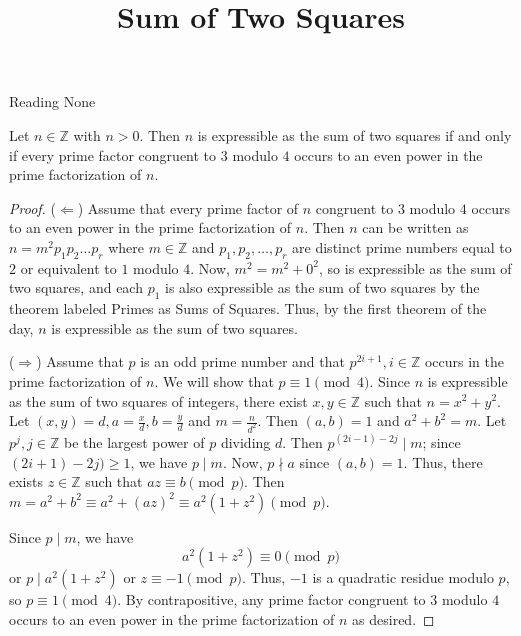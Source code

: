 \documentclass{ximera}
\title{Sum of Two Squares}
\begin{document}
\begin{abstract}
\end{abstract}
\maketitle


\begin{pre}
    \item[Reading] None
\end{pre}


\begin{theorem}\label{thm:express-sum-sqrs}
	Let $n\in\mathbb{Z}$ with $n>0$. Then $n$ is expressible as the sum of two squares if and only if every prime factor congruent to $3$ modulo  $4$ occurs to an even power in the prime factorization of $n$.

\begin{proof}
	($\Leftarrow$) Assume that every prime factor of $n$ congruent to $3$ modulo $4$ occurs to an even power in the prime factorization of $n$. Then $n$ can be written as $n=m^2p_1p_2\dots  p_r$ where $m\in\mathbb{Z}$ and $p_1,p_2,\dots,p_r$ are distinct prime numbers equal to $2$ or equivalent to $1$ modulo $4$. Now, $m^2=m^2+0^2$, so is expressible as the sum of two squares, and each $p_1$ is also expressible as the sum of two squares by the theorem labeled Primes as Sums of Squares. Thus, by the first theorem of the day, $n$ is expressible as the sum of two squares.
	
	($\Rightarrow$) Assume that $p$ is an odd prime number and that $p^{2i+1},i\in\mathbb{Z}$ occurs in the prime factorization of $n$. We will show that $p\equiv 1 \pmod 4$. Since $n$ is expressible as the sum of two squares of integers, there exist $x,y\in\mathbb{Z}$ such that $n=x^2+y^2.$ Let $(x,y)=d, a=\frac{x}{d},b=\frac{y}{d}$ and  $m=\frac{n}{d^2}$. Then $(a,b)=1$ and $a^2+b^2=m$. Let $p^j,j\in\mathbb{Z}$ be the largest power of $p$ dividing $d$. Then $p^{(2i-1)-2j}\mid m$; since $(2i+1)-2j)\geq 1$, we have $p\mid m$. Now, $p\nmid a$ since $(a,b)=1$. Thus, there exists $z\in\mathbb{Z}$ such that $az\equiv b \pmod p$. Then $m=a^2+b^2\equiv a^2+(az)^2\equiv a^2(1+z^2)\pmod p$.
	 
	Since $p\mid m$, we have \[a^2(1+z^2)\equiv 0\pmod p\] or $p\mid a^2(1+z^2)$ or $z\equiv -1 \pmod p$. Thus, $-1$ is a quadratic residue modulo $p$, so $p\equiv 1 \pmod 4$. By contrapositive, any prime factor congruent to $3$ modulo $4$ occurs to an even power in the prime factorization of $n$ as desired.
	 
	
   \end{proof}
\end{theorem}
\end{document}
